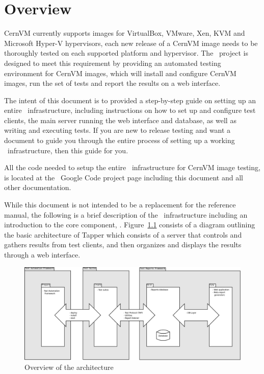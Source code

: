 \chapter{Overview}
\label{sct:overview}

CernVM currently supports images for VirtualBox, VMware, Xen, KVM and Microsoft Hyper-V hypervisors, each new release of a CernVM image needs to be 
thoroughly tested on each supported platform and hypervisor. The \cernvmreleasetesting\ project is designed to meet this requirement by providing an 
automated testing environment for CernVM images, which will install and configure CernVM images, run the set of tests and report the results on a web
interface.

The intent of this document is to provided a step-by-step guide on setting up an entire \cernvmreleasetesting\ infrastructure, including instructions
on how to set up and configure test clients, the main server running the web interface and database, as well as writing and executing tests. If you are
new to release testing and want a document to guide you through the entire process of setting up a working \cernvmreleasetesting\ infrastructure,
then this guide for you.

All the code needed to setup the entire \releasetesting\ infrastructure for CernVM image testing, is located at the \cernvmreleasetesting\ Google Code project
page\cite{GCreleasetesting} including this document and all other documentation. 

While this document is not intended to be a replacement for the reference manual, the following is a brief description of the \releasetesting\ infrastructure 
including an introduction to the core component, \amdtapper\cite{tapper}. Figure~\ref{fig:architecture} consists of a diagram outlining the basic architecture
of Tapper which consists of a server that controls and gathers results from test clients, and then organizes and 
displays the results through a web interface.\newline

\begin{figure}[!hbp]
	\begin{center}
		\includegraphics[scale=0.25]{img/tapper_architecture_overview.png}
	\end{center}
	\caption{Overview of the \tapper architecture}
	\label{fig:architecture}
\end{figure}

